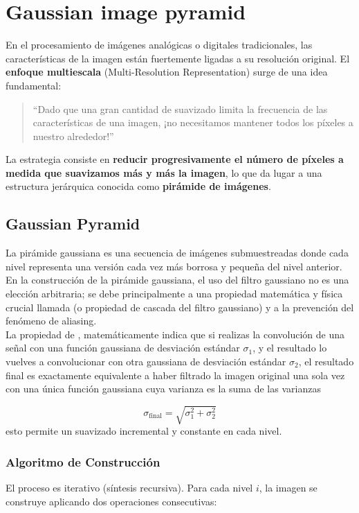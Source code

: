 \chapter{Gaussian image pyramid}
\noindent
En el procesamiento de imágenes analógicas o digitales tradicionales, las características de la imagen están fuertemente ligadas a su resolución original. El \textbf{enfoque multiescala} (Multi-Resolution Representation) surge de una idea fundamental:
\begin{quote}
    ``Dado que una gran cantidad de suavizado limita la frecuencia de las características de una imagen, ¡no necesitamos mantener todos los píxeles a nuestro alrededor!''
\end{quote}
La estrategia consiste en \textbf{reducir progresivamente el número de píxeles a medida que suavizamos más y más la imagen}, lo que da lugar a una estructura jerárquica conocida como \textbf{pirámide de imágenes}. \\


\section{Gaussian Pyramid}
La pirámide gaussiana es una secuencia de imágenes submuestreadas donde cada nivel representa una versión cada vez más borrosa y pequeña del nivel anterior. \\

\noindent
En la construcción de la pirámide gaussiana, el uso del filtro gaussiano no es una elección arbitraria; se debe principalmente a una propiedad matemática y física crucial llamada  (o propiedad de cascada del filtro gaussiano) y a la prevención del fenómeno de aliasing. \\

\noindent
La propiedad de , matemáticamente indica que si realizas la convolución de una señal con una función gaussiana de desviación estándar $\sigma_1$, y el resultado lo vuelves a convolucionar con otra gaussiana de desviación estándar $\sigma_2$, el resultado final es exactamente equivalente a haber filtrado la imagen original una sola vez con una única función gaussiana cuya varianza es la suma de las varianzas

$$\sigma_{\text{final}} = \sqrt{\sigma_1^2 + \sigma_2^2}$$
esto permite un suavizado incremental y constante en cada nivel.

\subsection{Algoritmo de Construcción}
\noindent
El proceso es iterativo (síntesis recursiva). Para cada nivel $i$, la imagen se construye aplicando dos operaciones consecutivas:

